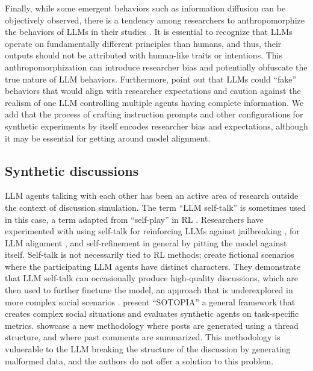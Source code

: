 Finally, while some emergent behaviors such as information diffusion can be objectively observed, there is a tendency among researchers to anthropomorphize the behaviors of \acp{LLM} in their studies \cite{rossi_2024}. It is essential to recognize that \acp{LLM} operate on fundamentally different principles than humans, and thus, their outputs should not be attributed with human-like traits or intentions. This anthropomorphization can introduce researcher bias and potentially obfuscate the true nature of \ac{LLM} behaviors. Furthermore, \citet{anthis_2025} point out that \acp{LLM} could “fake” behaviors that would align with researcher expectations and \citet{zhou-etal-2024-real} caution against the realism of one \ac{LLM} controlling multiple agents having complete information. We add that the process of crafting instruction prompts and other configurations for synthetic experiments by itself encodes researcher bias and expectations, although it may be essential for getting around model alignment.


\subsection{Synthetic discussions}
\label{ssec:related:discussions}

\ac{LLM} agents talking with each other has been an active area of research outside the context of discussion simulation. The term “\ac{LLM} self-talk” is sometimes used in this case, a term adapted from “self-play” in \ac{RL} \citep{cheng-self-play, ulmer2024}. Researchers have experimented with using self-talk for reinforcing \acp{LLM} against jailbreaking \cite{liu2024largelanguagemodelsagents, cheng-self-play, zheng2024optimalllmalignmentsusing}, for \ac{LLM} alignment \cite{Bai2022ConstitutionalAH, collective_constitution}, and self-refinement in general \cite{Madaan2023SelfRefineIR, lambert2024} by pitting the model against itself. Self-talk is not necessarily tied to \ac{RL} methods; \citet{ulmer2024} create fictional scenarios where the participating \ac{LLM} agents have distinct characters. They demonstrate that \ac{LLM} self-talk can occasionally produce high-quality discussions, which are then used to further finetune the model, an approach that is underexplored in more complex social scenarios \cite{zhou-etal-2024-real}. \citet{zhou_2024_sotopia} present “SOTOPIA” a general framework that creates complex social situations and evaluates synthetic agents on task-specific metrics.\citet{balog_2024} showcase a new methodology where posts are generated using a thread structure, and where past comments are summarized. This methodology is vulnerable to the \ac{LLM} breaking the structure of the discussion by generating malformed data, and the authors do not offer a solution to this problem. 

